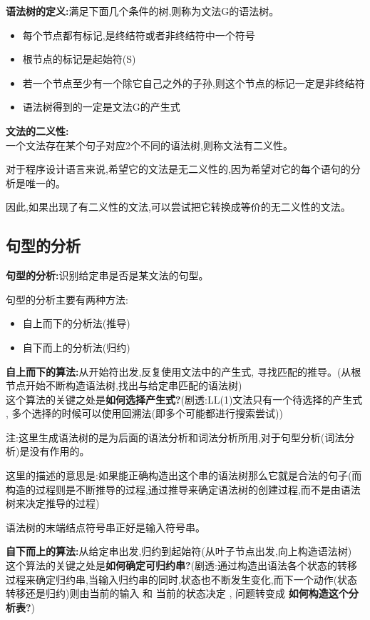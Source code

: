 \textbf{语法树的定义:}满足下面几个条件的树,则称为文法G的语法树。
\begin{itemize}
 \item 每个节点都有标记,是终结符或者非终结符中一个符号
 \item 根节点的标记是起始符(S)
 \item 若一个节点至少有一个除它自己之外的子孙,则这个节点的标记一定是非终结符
 \item 语法树得到的一定是文法G的产生式
\end{itemize}

\textbf{文法的二义性:}\\
一个文法存在某个句子对应2个不同的语法树,则称文法有二义性。

对于程序设计语言来说,希望它的文法是无二义性的,因为希望对它的每个语句的分析是唯一的。

因此,如果出现了有二义性的文法,可以尝试把它转换成等价的无二义性的文法。

\subsection{句型的分析}
\textbf{句型的分析:}识别给定串是否是某文法的句型。

句型的分析主要有两种方法:
\begin{itemize}
 \item 自上而下的分析法(推导)
 \item 自下而上的分析法(归约)
\end{itemize}

\textbf{自上而下的算法:}从开始符出发,反复使用文法中的产生式,
寻找匹配的推导。(从根节点开始不断构造语法树,找出与给定串匹配的语法树)\\
这个算法的关键之处是\textbf{如何选择产生式?}(剧透:LL(1)文法只有一个待选择的产生式 , 多个选择的时候可以使用回溯法(即多个可能都进行搜索尝试))

注:这里生成语法树的是为后面的语法分析和词法分析所用,对于句型分析(词法分析)是没有作用的。

这里的描述的意思是:如果能正确构造出这个串的语法树那么它就是合法的句子(而构造的过程则是不断推导的过程,通过推导来确定语法树的创建过程,而不是由语法树来决定推导的过程)

语法树的末端结点符号串正好是输入符号串。

\spaceline
\textbf{自下而上的算法:}从给定串出发,归约到起始符(从叶子节点出发,向上构造语法树)\\
这个算法的关键之处是\textbf{如何确定可归约串?}(剧透:通过构造出语法各个状态的转移过程来确定归约串,当输入归约串的同时,状态也不断发生变化,而下一个动作(状态转移还是归约)则由当前的输入 和 当前的状态决定 , 问题转变成 \textbf{如何构造这个分析表?})


